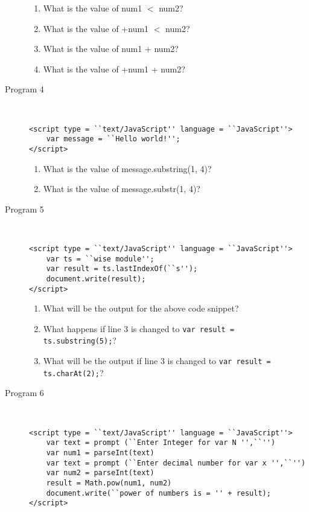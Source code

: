 \documentclass[11pt,a4paper]{article}
\def\AnswerBox{\fbox{\begin{minipage}{4in}\hfill\vspace{0.5in}\end{minipage}}}
\begin{document}
\begin{description}
\begin{enumerate}[label=\bfseries Q\arabic*:]\itemsep10pt
\item What is the value of num1 $<$ num2?
\item What is the value of +num1 $<$ num2?
\item What is the value of num1 + num2?
\item What is the value of +num1 + num2?
\end{enumerate}

\item [Program 4]\
\begin{lstlisting}
<script type = ``text/JavaScript'' language = ``JavaScript''>
    var message = ``Hello world!'';
</script>
\end{lstlisting}

\AnswerBox

\begin{enumerate}[label=\bfseries Q\arabic*:]\itemsep10pt
\item What is the value of message.substring(1, 4)?
\item What is the value of message.substr(1, 4)?
\end{enumerate}

\item [Program 5]\

\begin{lstlisting}
<script type = ``text/JavaScript'' language = ``JavaScript''>
    var ts = ``wise module'';
    var result = ts.lastIndexOf(``s''); 
    document.write(result);
</script>
\end{lstlisting}

\AnswerBox

\begin{enumerate}[label=\bfseries Q\arabic*:]\itemsep10pt
\item What will be the output for the above code snippet?
\item What happens if line 3 is changed to \texttt{var result = ts.substring(5);}?
\item What will be the output if line 3 is changed to \texttt{var result = ts.charAt(2);}?
\end{enumerate}

\item [Program 6]\
\begin{lstlisting}
<script type = ``text/JavaScript'' language = ``JavaScript''>
    var text = prompt (``Enter Integer for var N '',``'') 
    var num1 = parseInt(text)
    var text = prompt (``Enter decimal number for var x '',``'') 
    var num2 = parseInt(text)
    result = Math.pow(num1, num2)
    document.write(``power of numbers is = '' + result);
</script>
\end{lstlisting}


\end{description}
\end{document}
